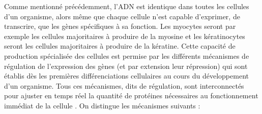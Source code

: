 Comme mentionné précédemment, l'ADN est identique dans toutes les cellules d'un organisme, alors même que chaque cellule n'est capable d'exprimer, de transcrire, que les gènes spécifiques à sa fonction. Les myocytes seront par exemple les cellules majoritaires à produire de la myosine et les kératinocytes seront les cellules majoritaires à produire de la kératine. Cette capacité de production spécialisée des cellules est permise par les différents mécanismes de régulation de l'expression des gènes (et par extension leur répression) qui sont établis dès les premières différenciations cellulaires au cours du développement d'un organisme. Tous ces mécanismes, dits de régulation, sont interconnectés pour ajuster en temps réel la quantité de protéines nécessaires au fonctionnement immédiat de la cellule \cite{Weake2010Jun}. On distingue les mécanismes suivants : 
